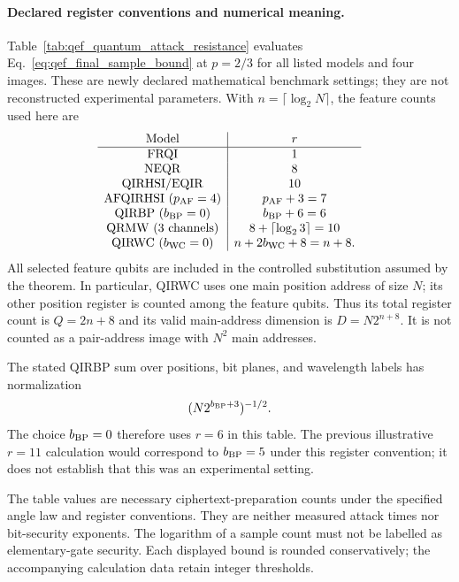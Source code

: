 \documentclass[11pt,a4paper]{article}
\begin{document}
{\paragraph{Declared register conventions and numerical meaning.}
Table~\ref{tab:qef_quantum_attack_resistance} evaluates
Eq.~\eqref{eq:qef_final_sample_bound} at $p=2/3$ for all listed models
and four images. These are newly declared mathematical benchmark
settings; they are not reconstructed experimental parameters.
With $n=\lceil\log_2N\rceil$, the feature counts used here are
\begin{equation}
\begin{array}{c|c}
\text{Model}&r\\\hline
\mathrm{FRQI}&1\\
\mathrm{NEQR}&8\\
\mathrm{QIRHSI/EQIR}&10\\
\mathrm{AFQIRHSI}\ (p_{\rm AF}=4)&p_{\rm AF}+3=7\\
\mathrm{QIRBP}\ (b_{\rm BP}=0)&b_{\rm BP}+6=6\\
\mathrm{QRMW}\ (3\text{ channels})&8+\lceil\log_2 3\rceil=10\\
\mathrm{QIRWC}\ (b_{\rm WC}=0)&n+2b_{\rm WC}+8=n+8.
\end{array}
\end{equation}
All selected feature qubits are included in the controlled substitution
assumed by the theorem. In particular, QIRWC uses one main position
address of size $N$; its other position register is counted among the
feature qubits. Thus its total register count is $Q=2n+8$ and its valid
main-address dimension is $D=N2^{n+8}$. It is not counted as a
pair-address image with $N^2$ main addresses.

The stated QIRBP sum over positions, bit planes, and wavelength labels
has normalization
\[
 (N2^{b_{\rm BP}+3})^{-1/2}.
\]
The choice $b_{\rm BP}=0$ therefore
uses $r=6$ in this table. The previous illustrative $r=11$ calculation
would correspond to $b_{\rm BP}=5$ under this register convention; it
does not establish that this was an experimental setting.

The table values are necessary ciphertext-preparation counts under the
specified angle law and register conventions. They are neither measured
attack times nor bit-security exponents. The logarithm of a sample count
must not be labelled as elementary-gate security. Each displayed bound
is rounded conservatively; the accompanying calculation data retain
integer thresholds.

}
\end{document}
